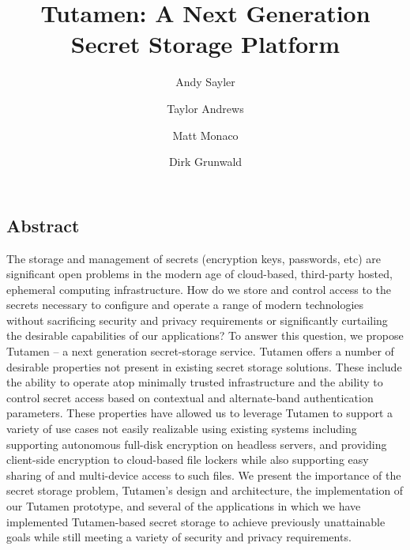 \documentclass[letterpaper,twocolumn,10pt]{article}
\begin{document}
\date{}

\title{\Large \bf Tutamen: A Next Generation Secret Storage Platform}

\author{Andy Sayler}
\author{Taylor Andrews}
\author{Matt Monaco}
\author{Dirk Grunwald}

\maketitle


\subsection*{Abstract}

The storage and management of secrets (encryption keys, passwords,
etc) are significant open problems in the modern age of cloud-based,
third-party hosted, ephemeral computing infrastructure. How do we
store and control access to the secrets necessary to configure and
operate a range of modern technologies without sacrificing security
and privacy requirements or significantly curtailing the desirable
capabilities of our applications? To answer this question, we propose
Tutamen -- a next generation secret-storage service. Tutamen offers a
number of desirable properties not present in existing secret storage
solutions. These include the ability to operate atop minimally trusted
infrastructure and the ability to control secret access based on
contextual and alternate-band authentication parameters. These
properties have allowed us to leverage Tutamen to support a variety of
use cases not easily realizable using existing systems including
supporting autonomous full-disk encryption on headless servers, and
providing client-side encryption to cloud-based file lockers while
also supporting easy sharing of and multi-device access to such
files. We present the importance of the secret storage problem,
Tutamen's design and architecture, the implementation of our Tutamen
prototype, and several of the applications in which we have
implemented Tutamen-based secret storage to achieve previously
unattainable goals while still meeting a variety of security and
privacy requirements.








{
  \footnotesize
  
  
}
\end{document}
